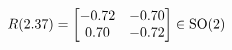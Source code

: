 \documentclass[preview]{standalone}
\begin{document}
\begin{align*}
\special{dvisvgm:raw <g id='unique000'>}R(2.37) = \begin{bmatrix} -0.72 & -0.70 \\ 0.70 & -0.72 \end{bmatrix} \in \text{SO}(2)\special{dvisvgm:raw </g>}
\end{align*}
\end{document}
